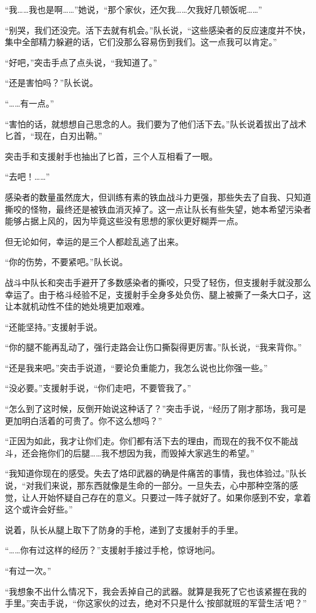 “我……我也是啊……”她说，“那个家伙，还欠我……欠我好几顿饭呢……”

“别哭，我们还没完。活下去就有机会。”队长说，“这些感染者的反应速度并不快，集中全部精力躲避的话，它们没那么容易伤到我们。这一点我可以肯定。”

“好吧，”突击手点了点头说，“我知道了。”

“还是害怕吗？”队长说。

“……有一点。”

“害怕的话，就想想自己思念的人。我们要为了他们活下去。”队长说着拔出了战术匕首，“现在，白刃出鞘。”

突击手和支援射手也抽出了匕首，三个人互相看了一眼。

“去吧！……”

感染者的数量虽然庞大，但训练有素的铁血战斗力更强，那些失去了自我、只知道撕咬的怪物，最终还是被铁血消灭掉了。这一点让队长有些失望，她本希望污染者能够占据上风的，因为毕竟这些没有思想的家伙更好糊弄一点。

但无论如何，幸运的是三个人都趁乱逃了出来。

“你的伤势，不要紧吧。”队长说。

战斗中队长和突击手避开了多数感染者的撕咬，只受了轻伤，但支援射手就没那么幸运了。由于格斗经验不足，支援射手全身多处负伤、腿上被撕了一条大口子，这让本就机动性不佳的她处境更加艰难。

“还能坚持。”支援射手说。

“你的腿不能再乱动了，强行走路会让伤口撕裂得更厉害。”队长说，“我来背你。”

“还是我来吧。”突击手说道，“要论负重能力，我怎么说也比你强一些。”

“没必要。”支援射手说，“你们走吧，不要管我了。”

“怎么到了这时候，反倒开始说这种话了？”突击手说，“经历了刚才那场，我可是更加明白活着的可贵了。你不这么想吗？”

“正因为如此，我才让你们走。你们都有活下去的理由，而现在的我不仅不能战斗，还会拖你们的后腿……我不想因为我，而毁掉大家逃生的希望。”

“我知道你现在的感受。失去了烙印武器的确是件痛苦的事情，我也体验过。”队长说，“对我们来说，那东西就像是生命的一部分。一旦失去，心中那种空落的感觉，让人开始怀疑自己存在的意义。只要过一阵子就好了。如果你感到不安，拿着这个或许会好些。”

说着，队长从腿上取下了防身的手枪，递到了支援射手的手里。

“……你有过这样的经历？”支援射手接过手枪，惊讶地问。

“有过一次。”

“我想象不出什么情况下，我会丢掉自己的武器。就算是我死了它也该紧握在我的手里。”突击手说，“你这家伙的过去，绝对不只是什么‘按部就班的军营生活’吧？”

